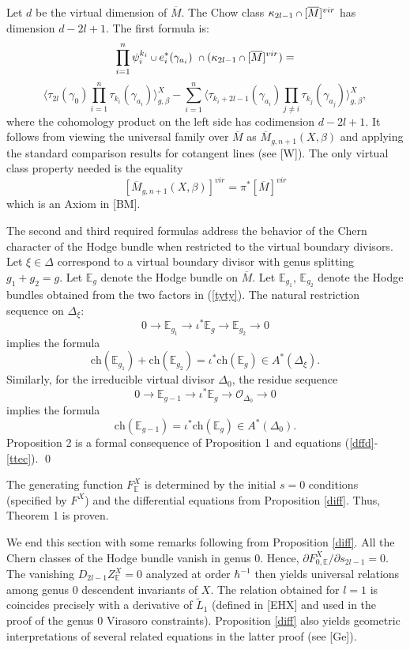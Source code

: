 \documentclass[11 pt]{amsart}
\newcommand{\rarr}{\rightarrow}
\newcommand{\oh}{{\mathcal{O}}}
\newcommand{\lan}{\langle}
\newcommand{\ran}{\rangle}
\def\scup{\mathbin{\text{\scriptsize$\cup$}}}
\def\scap{\mathbin{\text{\scriptsize$\cap$}}}
\newcommand{\epf}{\qed \vspace{+10pt}}
\newcommand{\hodge}{\mathbb{E}}
\newcommand{\ch}{\text{ch}}
\begin{document}
Let $d$ be the virtual dimension of $\overline{M}$.
The Chow class $\kappa_{2l-1} \scap [\overline{M}]^{vir}$
has dimension $d-2l+1$.
The first formula is:
\begin{equation}
\label{dffd}
\prod_{i=1}^n \psi_i^{k_i}\scup e_i^*(\gamma_{a_i})
   \ \scap (\kappa_{2l-1} \scap [\overline{M}]^{vir})=
\end{equation}
$$
\lan \tau_{2l}(\gamma_0) \prod_{i=1}^n \tau_{k_i}(\gamma_{a_i}) 
\ran^X_{g,\beta} -
\sum_{i=1}^n
\lan \tau_{k_i+2l-1}(\gamma_{a_i}) \prod_{j\neq i} \tau_{k_j}(\gamma_{a_j}) 
\ran^X_{g,\beta},$$
where the cohomology product on the left side has codimension
$d-2l+1$.
It 
follows from viewing
the universal family over $\overline{M}$ as
$\overline{M}_{g,n+1}(X, \beta)$ and applying
the standard comparison
results for cotangent lines (see [W]). The only virtual class
property needed is the equality 
$$[\overline{M}_{g,n+1}(X,\beta)]^{vir} = \pi^* [\overline{M}]^{vir}$$
which is an Axiom in [BM].

The second and third required formulas address the
behavior of the Chern character of the Hodge bundle
when restricted to the virtual boundary divisors.
Let $\xi\in \Delta$ correspond to a virtual boundary
divisor with genus splitting $g_1+g_2=g$.
Let $\hodge_g$ denote the Hodge bundle on $\overline{M}$.
Let $\hodge_{g_1}$, $\hodge_{g_2}$ denote the Hodge
bundles obtained from the two factors in (\ref{tyty}).
The natural restriction sequence on $\Delta_\xi$:
$$0 \rarr \hodge_{g_1} \rarr \iota^* \hodge_{g} \rarr
\hodge_{g_2} \rarr 0$$
implies the formula
\begin{equation}
\label{ssec}
\ch(\hodge_{g_1}) + \ch(\hodge_{g_2}) = \iota^* \ch(\hodge_g)
\in A^*(\Delta_\xi).
\end{equation}
Similarly, for the irreducible virtual divisor $\Delta_{0}$,
the residue sequence
$$0 \rarr \hodge_{g-1} \rarr \iota^* \hodge_g \rarr \oh_{\Delta_0}
\rarr 0$$
implies the formula
\begin{equation}
\label{ttec}
\ch(\hodge_{g-1}) = \iota^* \ch(\hodge_g)
\in A^*(\Delta_0).
\end{equation}
Proposition 2 is a formal consequence of Proposition 1
and equations (\ref{dffd}-\ref{ttec}).
\epf

The generating function $F^X_{\hodge}$ is determined
by the initial $s=0$ conditions (specified by $F^X$) and
the differential equations from Proposition \ref{diff}. Thus,
Theorem 1 is proven. 

We end this section with some remarks following from
Proposition \ref{diff}. All the Chern classes
of the Hodge bundle vanish in genus 0. 
Hence, $\partial F^X_{0,\hodge}/ \partial 
s_{2l-1}=0$. The vanishing $D_{2l-1} Z^X_\hodge =0$ 
analyzed at order $\hbar^{-1}$ then yields 
universal relations among genus 0 descendent invariants
of $X$. The relation obtained for $l=1$ is coincides precisely with
a derivative of
$\tilde{L}_1$ (defined in [EHX] and used in
the proof of the genus 0 Virasoro
constraints). Proposition \ref{diff} also
yields geometric interpretations of several related
equations in the latter proof (see [Ge]).
\end{document}
